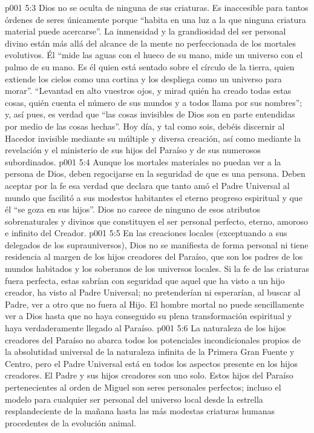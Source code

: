 \vs p001 5:3 Dios no se oculta de ninguna de sus criaturas. Es inaccesible para tantos órdenes de seres únicamente porque “habita en una luz a la que ninguna criatura material puede acercarse”. La inmensidad y la grandiosidad del ser personal divino están más allá del alcance de la mente no perfeccionada de los mortales evolutivos. Él “mide las aguas con el hueco de su mano, mide un universo con el palmo de su mano. Es él quien está sentado sobre el círculo de la tierra, quien extiende los cielos como una cortina y los despliega como un universo para morar”. “Levantad en alto vuestros ojos, y mirad quién ha creado todas estas cosas, quién cuenta el número de sus mundos y a todos llama por sus nombres”; y, así pues, es verdad que “las cosas invisibles de Dios son en parte entendidas por medio de las cosas hechas”. Hoy día, y tal como sois, debéis discernir al Hacedor invisible mediante su múltiple y diversa creación, así como mediante la revelación y el ministerio de sus hijos del Paraíso y de sus numerosos subordinados.
\vs p001 5:4 Aunque los mortales materiales no puedan ver a la persona de Dios, deben regocijarse en la seguridad de que es una persona. Deben aceptar por la fe esa verdad que declara que tanto amó el Padre Universal al mundo que facilitó a sus modestos habitantes el eterno progreso espiritual y que él “se goza en sus hijos”. Dios no carece de ninguno de esos atributos sobrenaturales y divinos que constituyen el ser personal perfecto, eterno, amoroso e infinito del Creador.
\vs p001 5:5 \pc En las creaciones locales (exceptuando a sus delegados de los suprauniversos), Dios no se manifiesta de forma personal ni tiene residencia al margen de los hijos creadores del Paraíso, que son los padres de los mundos habitados y los soberanos de los universos locales. Si la fe de las criaturas fuera perfecta, estas sabrían con seguridad que aquel que ha visto a un hijo creador, ha visto al Padre Universal; no pretenderían ni esperarían, al buscar al Padre, ver a otro que no fuera al Hijo. El hombre mortal no puede sencillamente ver a Dios hasta que no haya conseguido su plena transformación espiritual y haya verdaderamente llegado al Paraíso.
\vs p001 5:6 La naturaleza de los hijos creadores del Paraíso no abarca todos los potenciales incondicionales propios de la absolutidad universal de la naturaleza infinita de la Primera Gran Fuente y Centro, pero el Padre Universal está en todos los aspectos presente  en los hijos creadores. El Padre y sus hijos creadores son uno solo. Estos hijos del Paraíso pertenecientes al orden de Miguel son seres personales perfectos; incluso el modelo para cualquier ser personal del universo local desde la estrella resplandeciente de la mañana hasta las más modestas criaturas humanas procedentes de la evolución animal.
